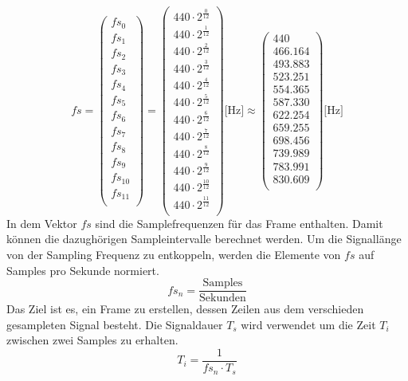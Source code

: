 \[
fs
=
 \begin{pmatrix}
fs_{0}\\[1mm]
fs_{1}\\[1mm]
fs_{2}\\[1mm]
fs_{3}\\[1mm]
fs_{4}\\[1mm]
fs_{5}\\[1mm]
fs_{6}\\[1mm]
fs_{7}\\[1mm]
fs_{8}\\[1mm]
fs_{9}\\[1mm]
fs_{10}\\[1mm]
fs_{11}\\[1mm]
\end{pmatrix}
=
\begin{pmatrix}
440\cdot2^{\frac{0}{12}}\\[0.5mm]
440\cdot2^{\frac{1}{12}}\\[0.5mm]
440\cdot2^{\frac{2}{12}}\\[0.5mm]
440\cdot2^{\frac{3}{12}}\\[0.5mm]
440\cdot2^{\frac{4}{12}}\\[0.5mm]
440\cdot2^{\frac{5}{12}}\\[0.5mm]
440\cdot2^{\frac{6}{12}}\\[0.5mm]
440\cdot2^{\frac{7}{12}}\\[0.5mm]
440\cdot2^{\frac{8}{12}}\\[0.5mm]
440\cdot2^{\frac{9}{12}}\\[0.5mm]
440\cdot2^{\frac{10}{12}}\\[0.5mm]
440\cdot2^{\frac{11}{12}}\\[0.5mm]
\end{pmatrix}
 \text{[Hz]}
 \approx
 \begin{pmatrix}
 440\\[1mm]
466.164\\[1mm]
493.883\\[1mm]
523.251\\[1mm]
554.365\\[1mm]
587.330\\[1mm]
622.254\\[1mm]
659.255\\[1mm]
698.456\\[1mm]
739.989\\[1mm]
783.991\\[1mm]
830.609\\[1mm]
 \end{pmatrix}
 \text{[Hz]} 
\]
In dem Vektor $fs$ sind die Samplefrequenzen für das Frame enthalten. Damit können die dazughörigen Sampleintervalle berechnet werden. Um die  Signallänge von der Sampling Frequenz zu entkoppeln, werden die Elemente von $fs$ auf Samples pro Sekunde normiert.  
\[fs_{n} = \frac{\text{Samples}}{\text{Sekunden}}\]
Das Ziel ist es, ein Frame zu erstellen, dessen Zeilen aus dem verschieden gesampleten Signal besteht. Die Signaldauer $T_{s}$ wird verwendet um die Zeit $T_{i}$ zwischen zwei Samples zu erhalten.
\[T_{i}=\frac{1}{fs_{n}\cdot T_{s}}\]

